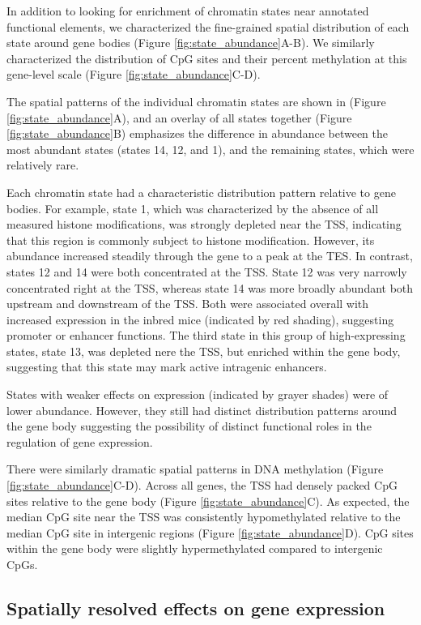 \documentclass[10pt,letterpaper]{article}
\begin{document}
In addition to looking for enrichment of chromatin states near annotated
functional elements, we characterized the fine-grained spatial
distribution of each state around gene bodies (Figure
\ref{fig:state_abundance}A-B). We similarly characterized the
distribution of CpG sites and their percent methylation at this
gene-level scale (Figure \ref{fig:state_abundance}C-D).

The spatial patterns of the individual chromatin states are shown in
(Figure \ref{fig:state_abundance}A), and an overlay of all states
together (Figure \ref{fig:state_abundance}B) emphasizes the difference
in abundance between the most abundant states (states 14, 12, and 1),
and the remaining states, which were relatively rare.

Each chromatin state had a characteristic distribution pattern relative
to gene bodies. For example, state 1, which was characterized by the
absence of all measured histone modifications, was strongly depleted
near the TSS, indicating that this region is commonly subject to histone
modification. However, its abundance increased steadily through the gene
to a peak at the TES. In contrast, states 12 and 14 were both
concentrated at the TSS. State 12 was very narrowly concentrated right
at the TSS, whereas state 14 was more broadly abundant both upstream and
downstream of the TSS. Both were associated overall with increased
expression in the inbred mice (indicated by red shading), suggesting
promoter or enhancer functions. The third state in this group of
high-expressing states, state 13, was depleted nere the TSS, but
enriched within the gene body, suggesting that this state may mark
active intragenic enhancers.

States with weaker effects on expression (indicated by grayer shades)
were of lower abundance. However, they still had distinct distribution
patterns around the gene body suggesting the possibility of distinct
functional roles in the regulation of gene expression.

There were similarly dramatic spatial patterns in DNA methylation
(Figure \ref{fig:state_abundance}C-D). Across all genes, the TSS had
densely packed CpG sites relative to the gene body (Figure
\ref{fig:state_abundance}C). As expected, the median CpG site near the
TSS was consistently hypomethylated relative to the median CpG site in
intergenic regions (Figure \ref{fig:state_abundance}D). CpG sites within
the gene body were slightly hypermethylated compared to intergenic CpGs.

\hypertarget{spatially-resolved-effects-on-gene-expression}{%
\subsection{Spatially resolved effects on gene
expression}\label{spatially-resolved-effects-on-gene-expression}}
\end{document}
